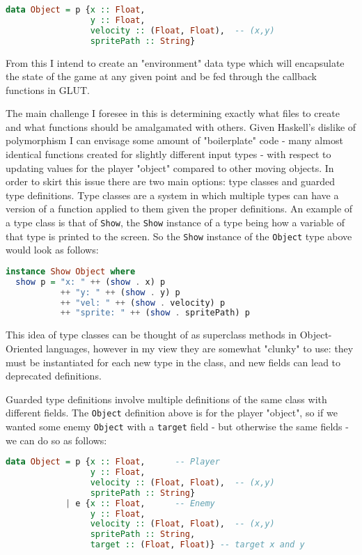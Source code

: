 \documentclass[12pt, a4paper]{report}
\begin{document}
\begin{lstlisting}[language=Haskell]
data Object = p {x :: Float,
                 y :: Float,
                 velocity :: (Float, Float),  -- (x,y)
                 spritePath :: String}
\end{lstlisting}

From this I intend to create an "environment" data type which will encapsulate the state of the game at any given point and be fed through the callback functions in GLUT.

\par

The main challenge I foresee in this is determining exactly what files to create and what functions should be amalgamated with others.
Given Haskell's dislike of polymorphism I can envisage some amount of "boilerplate" code - many almost identical functions created for slightly different input types - with respect to updating values for the player "object" compared to other moving objects.
In order to skirt this issue there are two main options: type classes and guarded type definitions.
Type classes are a system in which multiple types can have a version of a function applied to them given the proper definitions.
An example of a type class is that of \verb|Show|, the \verb|Show| instance of a type being how a variable of that type is printed to the screen.
So the \verb|Show| instance of the \verb|Object| type above would look as follows:

\begin{lstlisting}[language=Haskell]
instance Show Object where
  show p = "x: " ++ (show . x) p
           ++ "y: " ++ (show . y) p
           ++ "vel: " ++ (show . velocity) p
           ++ "sprite: " ++ (show . spritePath) p
\end{lstlisting}

This idea of type classes can be thought of as superclass methods in Object-Oriented languages, however in my view they are somewhat "clunky" to use: they must be instantiated for each new type in the class, and new fields can lead to deprecated definitions.

\par

Guarded type definitions involve multiple definitions of the same class with different fields.
The \verb|Object| definition above is for the player "object", so if we wanted some enemy \verb|Object| with a \verb|target| field - but otherwise the same fields - we can do so as follows:

\begin{lstlisting}[language=Haskell]
data Object = p {x :: Float,      -- Player
                 y :: Float,
                 velocity :: (Float, Float),  -- (x,y)
                 spritePath :: String}
            | e {x :: Float,      -- Enemy
                 y :: Float,
                 velocity :: (Float, Float),  -- (x,y)
                 spritePath :: String,
                 target :: (Float, Float)} -- target x and y
\end{lstlisting}
\end{document}
